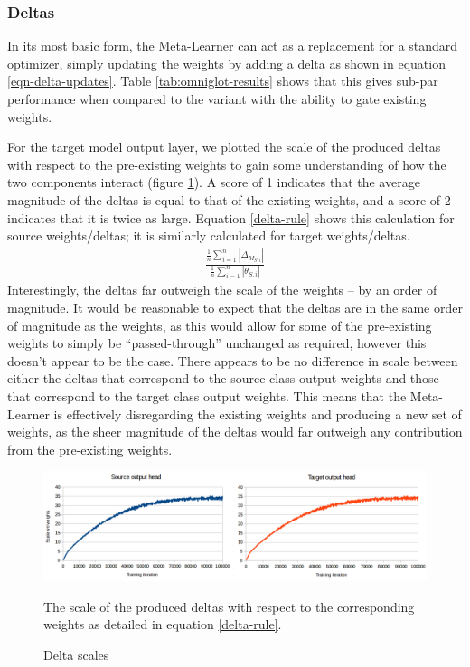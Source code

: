 \documentclass{report}
\newcommand\ddfrac[2]{\frac{\displaystyle #1}{\displaystyle #2}}
\begin{document}
\subsubsection{Deltas}
In its most basic form, the Meta-Learner can act as a replacement for a standard optimizer, simply updating the weights by adding a delta as shown in equation \ref{eqn-delta-updates}. Table \ref{tab:omniglot-results} shows that this gives sub-par performance when compared to the variant with the ability to gate existing weights. \par
For the target model output layer, we plotted the scale of the produced deltas with respect to the pre-existing weights to gain some understanding of how the two components interact (figure \ref{fig:deltascale:1}). A score of 1 indicates that the average magnitude of the deltas is equal to that of the existing weights, and a score of 2 indicates that it is twice as large. Equation \ref{delta-rule} shows this calculation for source weights/deltas; it is similarly calculated for target weights/deltas.
\begin{align} \label{delta-rule}
\ddfrac{\frac{1}{n}\sum_{i=1}^{n}|\Delta_{M_{S,i}}|}{\frac{1}{n}\sum_{i=1}^{n}|\theta_{S,i}|}
\end{align}
Interestingly, the deltas far outweigh the scale of the weights -- by an order of magnitude. It would be reasonable to expect that the deltas are in the same order of magnitude as the weights, as this would allow for some of the pre-existing weights to simply be ``passed-through'' unchanged as required, however this doesn't appear to be the case. There appears to be no difference in scale between either the deltas that correspond to the source class output weights and those that correspond to the target class output weights. This means that the Meta-Learner is effectively disregarding the existing weights and producing a new set of weights, as the sheer magnitude of the deltas would far outweigh any contribution from the pre-existing weights.

\begin{figure}[h!]
	\centering
	\includegraphics[width=16cm]{deltascale}
	\caption{Delta scales}
	The scale of the produced deltas with respect to the corresponding weights as detailed in equation \ref{delta-rule}.
	\label{fig:deltascale:1}
\end{figure}
\end{document}
